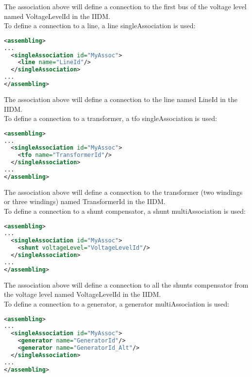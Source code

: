 \documentclass[a4paper, 12pt]{report}
\begin{document}
The association above will define a connection to the first bus of the voltage level named VoltageLevelId in the IIDM. \\

To define a connection to a line, a line singleAssociation is used:

 \begin{lstlisting}[language=XML, breaklines=true, breakatwhitespace=false, columns=fullflexible]
<assembling>
...
  <singleAssociation id="MyAssoc">
    <line name="LineId"/>
  </singleAssociation>
...
</assembling>
\end{lstlisting}

The association above will define a connection to the line named LineId in the IIDM. \\

To define a connection to a transformer, a tfo singleAssociation is used:

 \begin{lstlisting}[language=XML, breaklines=true, breakatwhitespace=false, columns=fullflexible]
<assembling>
...
  <singleAssociation id="MyAssoc">
    <tfo name="TransformerId"/>
  </singleAssociation>
...
</assembling>
\end{lstlisting}

The association above will define a connection to the transformer (two windings or three windings) named TransformerId in the IIDM. \\

To define a connection to a shunt compensator, a shunt multiAssociation is used:

 \begin{lstlisting}[language=XML, breaklines=true, breakatwhitespace=false, columns=fullflexible]
<assembling>
...
  <singleAssociation id="MyAssoc">
    <shunt voltageLevel="VoltageLevelId"/>
  </singleAssociation>
...
</assembling>
\end{lstlisting}

The association above will define a connection to all the shunts compensator from the voltage level named VoltageLevelId in the IIDM. \\

To define a connection to a generator, a generator multiAssociation is used:

 \begin{lstlisting}[language=XML, breaklines=true, breakatwhitespace=false, columns=fullflexible]
<assembling>
...
  <singleAssociation id="MyAssoc">
    <generator name="GeneratorId"/>
    <generator name="GeneratorId_Alt"/>
  </singleAssociation>
...
</assembling>
\end{lstlisting}
\end{document}
